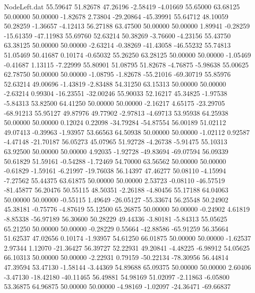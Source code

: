 \begin{filecontents}{NodeLeft.dat}
  55.59647   51.82678   47.26196    -2.58419   -4.01669   55.65000   63.68125   50.00000   50.00000   -1.82678    2.73804  -29.20864  -45.39991
  55.64712   48.10059   50.28259    -1.36657   -4.12413   56.27188   63.47500   50.00000   50.00000    1.89941   -0.28259  -15.61359  -47.11983
  55.69760   52.63214   50.38269    -3.76600   -4.23156   55.43750   63.38125   50.00000   50.00000   -2.63214   -0.38269  -41.43058  -46.55232
  55.74813   51.05469   50.41687     0.10174   -0.65032   55.26250   63.28125   50.00000   50.00000   -1.05469   -0.41687    1.13115   -7.22999
  55.80901   51.08795   51.82678    -4.76875   -5.98638   55.00625   62.78750   50.00000   50.00000   -1.08795   -1.82678  -55.21016  -69.30719
  55.85976   52.63214   49.00696    -1.43819   -2.83488   54.31250   63.15313   50.00000   50.00000   -2.63214    0.99304  -16.23551  -32.00246
  55.90033   52.16217   45.34825    -1.97538   -5.84313   53.82500   64.41250   50.00000   50.00000   -2.16217    4.65175  -23.29705  -68.91213
  55.95127   49.87976   49.77902    -2.97813   -4.69713   53.95938   64.25938   50.00000   50.00000    0.12024    0.22098  -34.79284  -54.87554
  56.00189   51.02112   49.07413    -0.39963   -1.93957   53.66563   64.50938   50.00000   50.00000   -1.02112    0.92587   -4.47148  -21.70187
  56.05273   45.07965   51.92728    -4.26738   -5.91475   55.10313   63.92500   50.00000   50.00000    4.92035   -1.92728  -49.83694  -69.07594
  56.09339   50.61829   51.59161    -0.54288   -1.72469   54.70000   63.56562   50.00000   50.00000   -0.61829   -1.59161   -6.21997  -19.76038
  56.14397   47.46277   50.08110    -4.15994   -7.27562   55.44375   63.61875   50.00000   50.00000    2.53723   -0.08110  -46.57519  -81.45877
  56.20476   50.55115   48.50351    -2.26188   -4.80456   55.17188   64.04063   50.00000   50.00000   -0.55115    1.49649  -26.05127  -55.33674
  56.25548   50.24902   45.38181    -0.75776   -4.87619   55.12500   65.26875   50.00000   50.00000   -0.24902    4.61819   -8.85338  -56.97189
  56.30600   50.28229   49.44336    -3.80181   -5.84313   55.05625   65.21250   50.00000   50.00000   -0.28229    0.55664  -42.88586  -65.91259
  56.35664   51.62537   47.02656     0.10174   -1.93957   54.61250   66.01875   50.00000   50.00000   -1.62537    2.97344    1.12070  -21.36427
  56.39727   52.22931   49.20841    -4.48225   -6.98912   54.05625   66.10313   50.00000   50.00000   -2.22931    0.79159  -50.22134  -78.30956
  56.44814   47.39594   53.47130    -1.58144   -3.44369   54.89688   65.09375   50.00000   50.00000    2.60406   -3.47130  -18.42180  -40.11465
  56.49881   54.98169   51.02097    -2.11863   -6.05800   53.36875   64.96875   50.00000   50.00000   -4.98169   -1.02097  -24.36471  -69.66837

\end{filecontents}
